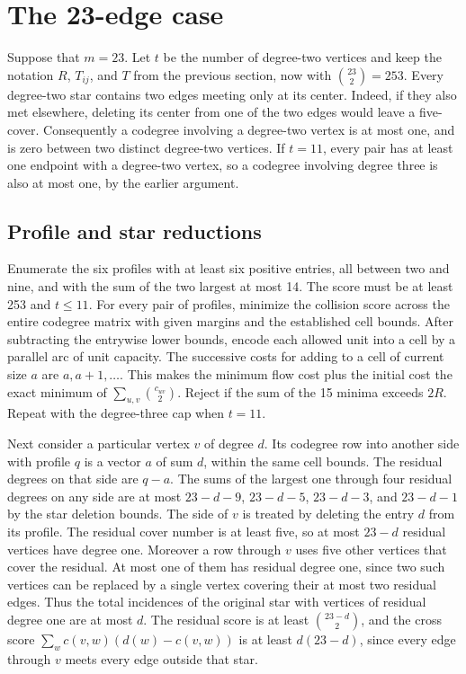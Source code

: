 \section{The 23-edge case}

Suppose that $m=23$. Let $t$ be the number of degree-two vertices
and keep the notation $R$, $T_{ij}$, and $T$ from the previous section,
now with $\binom{23}{2}=253$. Every degree-two star contains two
edges meeting only at its center. Indeed, if they also met elsewhere,
deleting its center from one of the two edges would leave a five-cover.
Consequently a codegree involving a degree-two vertex is at most one,
and is zero between two distinct degree-two vertices. If $t=11$, every
pair has at least one endpoint with a degree-two vertex, so a codegree
involving degree three is also at most one, by the earlier argument.

\subsection{Profile and star reductions}

Enumerate the six profiles with at least six positive entries, all
between two and nine, and with the sum of the two largest at most 14.
The score must be at least 253 and $t\leq11$. For every pair
of profiles, minimize the collision score across the entire codegree
matrix with given margins and the established cell bounds. After
subtracting the entrywise lower bounds, encode each allowed unit into
a cell by a parallel arc of unit capacity. The successive costs
for adding to a cell of current size $a$ are $a,a+1,\ldots$.
This makes the minimum flow cost plus the initial cost the exact
minimum of $\sum_{u,v}\binom{c_{uv}}2$. Reject if the sum of the
15 minima exceeds $2R$. Repeat with the degree-three cap when $t=11$.

Next consider a particular vertex $v$ of degree $d$. Its codegree
row into another side with profile $q$ is a vector $a$ of sum $d$,
within the same cell bounds. The residual degrees on that side are
$q-a$. The sums of the largest one through four residual
degrees on any side are at most $23-d-9$, $23-d-5$,
$23-d-3$, and $23-d-1$ by the star deletion bounds. The side of $v$
is treated by deleting the entry $d$ from its profile. The residual
cover number is at least five, so at most $23-d$ residual vertices
have degree one. Moreover a row through $v$ uses five other vertices
that cover the residual. At most one of them has residual degree one,
since two such vertices can be replaced by a single vertex covering
their at most two residual edges. Thus the total incidences of the
original star with vertices of residual degree one are at most $d$.
The residual score is at least $\binom{23-d}{2}$, and the cross score
$\sum_{w}c(v,w)(d(w)-c(v,w))$ is at least $d(23-d)$, since every
edge through $v$ meets every edge outside that star.

